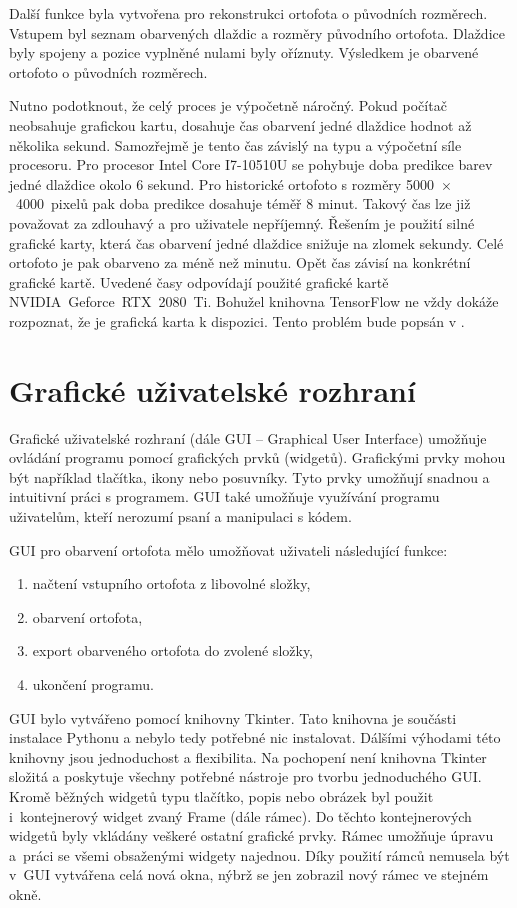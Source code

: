 Další funkce byla vytvořena pro rekonstrukci ortofota o původních rozměrech. Vstupem byl seznam obarvených dlaždic a rozměry původního ortofota. Dlaždice byly spojeny a pozice vyplněné nulami byly oříznuty. Výsledkem je obarvené ortofoto o původních rozměrech.

Nutno podotknout, že celý proces je výpočetně náročný. Pokud počítač neobsahuje grafickou kartu, dosahuje čas obarvení jedné dlaždice hodnot až několika sekund. Samozřejmě je tento čas závislý na typu a výpočetní síle procesoru. Pro procesor Intel Core I7-10510U se pohybuje doba predikce barev jedné dlaždice okolo 6 sekund. Pro historické ortofoto s rozměry 5000~$\times$~4000~pixelů pak doba predikce dosahuje téměř 8 minut. Takový čas lze již považovat za zdlouhavý a pro uživatele nepříjemný. Řešením je použití silné grafické karty, která čas obarvení jedné dlaždice snižuje na zlomek sekundy. Celé ortofoto je pak obarveno za méně než minutu. Opět čas závisí na konkrétní grafické kartě. Uvedené časy odpovídají použité grafické kartě NVIDIA~Geforce~RTX~2080~Ti. Bohužel knihovna TensorFlow ne vždy dokáže rozpoznat, že je grafická karta k dispozici. Tento problém bude popsán v .

\section{Grafické uživatelské rozhraní}
Grafické uživatelské rozhraní (dále GUI -- Graphical User Interface) umožňuje ovládání programu pomocí grafických prvků (widgetů). Grafickými prvky mohou být například tlačítka, ikony nebo posuvníky. Tyto prvky umožňují snadnou a intuitivní práci s programem. GUI také umožňuje využívání programu uživatelům, kteří nerozumí psaní a manipulaci s kódem.

\newpage
GUI pro obarvení ortofota mělo umožňovat uživateli následující funkce:
\begin{enumerate}
  \item načtení vstupního ortofota z libovolné složky,
  \item obarvení ortofota,
  \item export obarveného ortofota do zvolené složky,
  \item ukončení programu.
\end{enumerate}

GUI bylo vytvářeno pomocí knihovny Tkinter. Tato knihovna je součásti instalace Pythonu a nebylo tedy potřebné nic instalovat. Dálšími výhodami této knihovny jsou jednoduchost a flexibilita. Na pochopení není knihovna Tkinter složitá a poskytuje všechny potřebné nástroje pro tvorbu jednoduchého GUI. Kromě běžných widgetů typu tlačítko, popis nebo obrázek byl použit i~kontejnerový widget zvaný Frame (dále rámec). Do těchto kontejnerových widgetů byly vkládány veškeré ostatní grafické prvky. Rámec umožňuje úpravu a~práci se všemi obsaženými widgety najednou. Díky použití rámců nemusela být v~GUI vytvářena celá nová okna, nýbrž se jen zobrazil nový rámec ve stejném okně.

